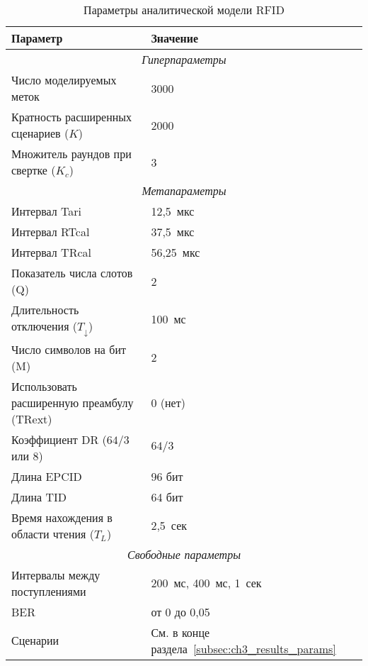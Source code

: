 \begin{table}[!t]
	\renewcommand{\arraystretch}{1.3}
	\caption{Параметры аналитической модели RFID}
	\label{table:ch3_results_params}
	\centering
	\begin{tabular}{|l|l|}
		\hline
		Параметр   & Значение \\\hline
		\multicolumn{2}{|c|}{\textit{Гиперпараметры}} \\\hline
		Число моделируемых меток              & 3000  \\
		Кратность расширенных сценариев ($K$) & 2000  \\
		Множитель раундов при свертке ($K_c$) & 3     \\\hline
		\multicolumn{2}{|c|}{\textit{Метапараметры}} \\\hline
		Интервал Tari                              & 12,5~мкс   \\
		Интервал RTcal                             & 37,5~мкс   \\
		Интервал TRcal                             & 56,25~мкс  \\
		Показатель числа слотов (Q)                & 2          \\
		Длительность отключения ($T_\downarrow$)   & 100~мс     \\
		Число символов на бит (M)                  & 2          \\
		Использовать расширенную преамбулу (TRext) & 0 (нет)    \\
		Коэффициент DR ($64/3$ или 8)              & $64/3$     \\
		Длина EPCID                                & 96 бит     \\
		Длина TID                                  & 64 бит     \\
		Время нахождения в области чтения ($T_L$)  & 2,5~сек    \\\hline
		\multicolumn{2}{|c|}{\textit{Свободные параметры}} \\\hline
		Интервалы между поступлениями   & 200~мс, 400~мс, 1~сек \\
		BER                             & от 0 до 0,05 \\
		Сценарии                        & См. в конце раздела~\ref{subsec:ch3_results_params} \\\hline
	\end{tabular}
\end{table}

